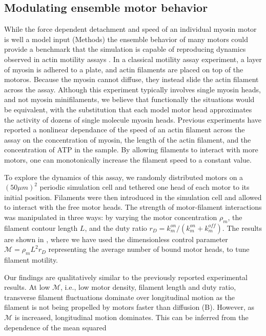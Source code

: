 \documentclass[12pt]{article}
\begin{document}
\subsection{Modulating ensemble motor behavior}
While the force dependent detachment and speed of an individual myosin motor is
well a model input (Methods) the ensemble behavior of many motors could provide
a benchmark that the simulation is capable of reproducing dynamics observed in 
actin motility assays \cite{riveline1998, walcott2012}. In a classical motility
assay experiment, a layer of myosin is adhered to a plate, and actin filaments
are placed on top of the motoros. Because the myosin cannot diffuse, they
instead slide the actin filament across the assay. Although this experiment
typically involves single myosin heads, and not myosin minifilaments, we believe
that functionally the situations would be equivalent, with the substitution that
each model motor head approximates the activity of dozens of single molecule
myosin heads. Previous experiments \cite{harris1993, umemoto1990} have reported
a nonlinear dependance of the speed of an actin filament across the assay on the
concentration of myosin, the length of the actin filament, and the concentration
of ATP in the sample. By allowing filaments to interact with more motors, one
can monotonically increase the filament speed to a constant value.
\par
To explore the dynamics of this assay, we randomly distributed motors on a
$(50\mu m)^2$ periodic simulation cell and tethered one head of each motor to
its initial position. Filaments were then introduced in the simulation cell and 
allowed to interact with the free motor heads. The strength of motor-filament
interactions was manipulated in three ways: by varying the motor concentration
$\rho_m$, the filament contour length $L$, and the duty ratio $r_D =k_m^{on}/(k_m^{on}+k_m^{off})$. 
The results are shown in , where we have used the
dimensionless control parameter $\mathcal{M} = \rho_m L^2 r_D$ representing the
average number of bound motor heads, to tune filament motility.
\par
Our findings are qualitatively similar to the previously reported experimental 
results. At low $\mathcal{M}$, i.e., low motor density, filament length and duty
ratio, transverse filament fluctuations dominate over longitudinal motion as
the filament is not being propelled by motors faster than diffusion
(B). However, as $\mathcal{M}$ is increased, longitudinal
motion dominates. This can be inferred from the dependence of the mean squared
\end{document}
